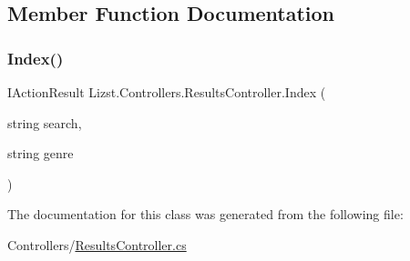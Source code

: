 \subsection{Member Function Documentation}
\mbox{\label{class_lizst_1_1_controllers_1_1_results_controller_a55251b7496d76b52cd4aba33cef838a0}} 
\subsubsection{\texorpdfstring{Index()}{Index()}}
{\footnotesize\ttfamily I\+Action\+Result Lizst.\+Controllers.\+Results\+Controller.\+Index (\begin{DoxyParamCaption}\item[{string}]{search,  }\item[{string}]{genre }\end{DoxyParamCaption})}



The documentation for this class was generated from the following file\+:\begin{DoxyCompactItemize}
\item 
Controllers/\mbox{\hyperlink{_results_controller_8cs}{Results\+Controller.\+cs}}\end{DoxyCompactItemize}
